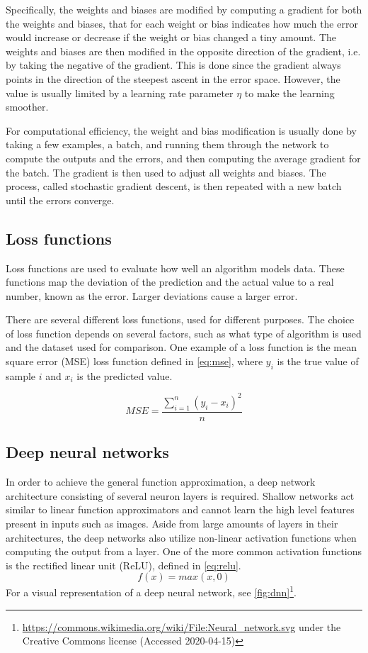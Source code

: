\documentclass{kththesis}
\begin{document}
Specifically, the weights and biases are modified by computing a gradient for both the weights and biases, that for each weight or bias indicates how much the error would increase or decrease if the weight or bias changed a tiny amount. The weights and biases are then modified in the opposite direction of the gradient, i.e. by taking the negative of the gradient. This is done since the gradient always points in the direction of the steepest ascent in the error space. However, the value is usually limited by a learning rate parameter $\eta$ to make the learning smoother. \parencite{lecun2015deep}

For computational efficiency, the weight and bias modification is usually done by taking a few examples, a batch, and running them through the network to compute the outputs and the errors, and then computing the average gradient for the batch. The gradient is then used to adjust all weights and biases. The process, called stochastic gradient descent, is then repeated with a new batch until the errors converge. \parencite{bottou2010large}

\subsection{Loss functions}
\label{sec:loss}
Loss functions are used to evaluate how well an algorithm models data. These functions map the deviation of the prediction and the actual value to a real number, known as the error. Larger deviations cause a larger error.

There are several different loss functions, used for different purposes. The choice of loss function depends on several factors, such as what type of algorithm is used and the dataset used for comparison. One example of a loss function is the mean square error (MSE) loss function defined in \autoref{eq:mse}, where $y_i$ is the true value of sample $i$ and $x_i$ is the predicted value. \parencite{CommonLo62:online}

\begin{equation}
\label{eq:mse}
MSE = \frac{\sum_{i=1}^n (y_i - x_i)^2}{n}
\end{equation}

\subsection{Deep neural networks}
In order to achieve the general function approximation, a deep network architecture consisting of several neuron layers is required. Shallow networks act similar to linear function approximators and cannot learn the high level features present in inputs such as images. Aside from large amounts of layers in their architectures, the deep networks also utilize non-linear activation functions when computing the output from a layer. One of the more common activation functions is the rectified linear unit (ReLU), defined in \autoref{eq:relu}.
\begin{equation}
\label{eq:relu}
f(x) = max(x, 0)
\end{equation}
For a visual representation of a deep neural network, see \autoref{fig:dnn}\footnote{\url{https://commons.wikimedia.org/wiki/File:Neural_network.svg} under the Creative Commons license (Accessed 2020-04-15)}.
\end{document}
